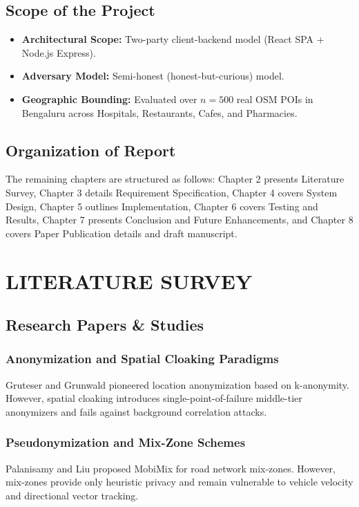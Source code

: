 \documentclass[12pt,a4paper,oneside]{report}
\begin{document}
\section{Scope of the Project}
\begin{itemize}
    \item \textbf{Architectural Scope:} Two-party client-backend model (React SPA + Node.js Express).
    \item \textbf{Adversary Model:} Semi-honest (honest-but-curious) model.
    \item \textbf{Geographic Bounding:} Evaluated over $n = 500$ real OSM POIs in Bengaluru across Hospitals, Restaurants, Cafes, and Pharmacies.
\end{itemize}

\section{Organization of Report}
The remaining chapters are structured as follows: Chapter 2 presents Literature Survey, Chapter 3 details Requirement Specification, Chapter 4 covers System Design, Chapter 5 outlines Implementation, Chapter 6 covers Testing and Results, Chapter 7 presents Conclusion and Future Enhancements, and Chapter 8 covers Paper Publication details and draft manuscript.


\chapter{LITERATURE SURVEY}

\section{Research Papers \& Studies}
\subsection{Anonymization and Spatial Cloaking Paradigms}
Gruteser and Grunwald pioneered location anonymization based on k-anonymity. However, spatial cloaking introduces single-point-of-failure middle-tier anonymizers and fails against background correlation attacks.

\subsection{Pseudonymization and Mix-Zone Schemes}
Palanisamy and Liu proposed MobiMix for road network mix-zones. However, mix-zones provide only heuristic privacy and remain vulnerable to vehicle velocity and directional vector tracking.
\end{document}
